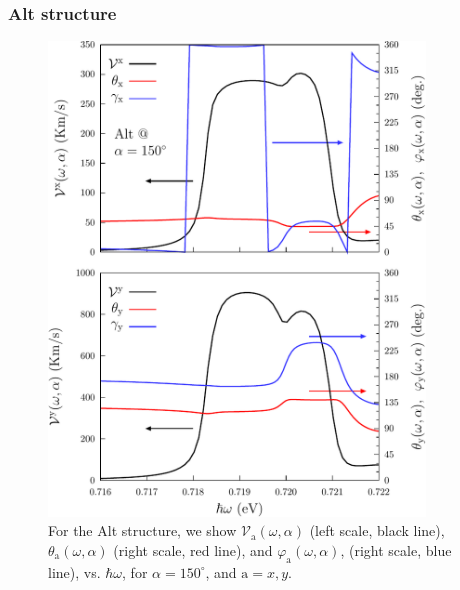 \documentclass[floatfix,prb,aps,superscriptaddress,showpacs,11pt,preprint,letterpaper]{revtex4}
\def\tama{10cm}
\begin{document}
\subsubsection{Alt structure}

\begin{figure}[tb]
\centering
\includegraphics[width=\tama]{altplots/alt-vx-vy-w1}
\caption{For the Alt structure, we show $\mathcal{V}_{\mathrm{a}}
(\omega,\alpha)$ (left scale, black line), $\theta_{\mathrm{a}} (\omega,\alpha)$
(right scale, red line), and $\varphi_{\mathrm{a}} (\omega,\alpha)$, (right
scale, blue line), vs. $\hbar\omega$, for $\alpha=150^\circ$, and $\mathrm{a} =
x,y$. }
\label{fig:alt-vx-vy-w1}
\end{figure}
\end{document}
